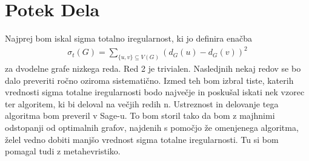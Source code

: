 \documentclass[12pt,a4paper]{amsart}
\theoremstyle{definition} %
\theoremstyle{plain} %
\begin{document}
\section{Potek Dela}
Najprej bom iskal sigma totalno iregularnost, ki jo definira enačba
\begin{align}
    \sigma_t(G) = \sum_{\{u,v\} \subseteq V(G)} (d_G(u) - d_G(v))^2
\end{align}
za dvodelne grafe nizkega reda. Red 2 je trivialen. Nasledjnih nekaj redov se bo dalo preveriti ročno oziroma sistematično.
Izmed teh bom izbral tiste, katerih vrednosti sigma totalne iregularnosti bodo največje in poskušal iskati nek vzorec
ter algoritem, ki bi deloval na večjih redih n. Ustreznost in delovanje tega algoritma bom preveril v Sage-u.
To bom storil tako da bom z majhnimi odstopanji od optimalnih grafov, najdenih s pomočjo že omenjenega
algoritma, želel vedno dobiti manjšo vrednost sigma totalne iregularnosti. Tu si bom pomagal tudi z metahevristiko.
\end{document}

